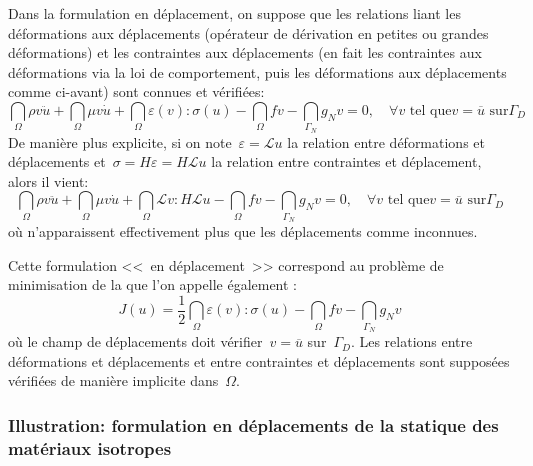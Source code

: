 \medskip
Dans la formulation en déplacement, on suppose que les relations liant les
déformations aux déplacements (opérateur de dérivation en petites ou grandes
déformations) et les contraintes aux déplacements (en fait les contraintes aux
déformations via la loi de comportement, puis les déformations aux déplacements
comme ci-avant) sont connues et vérifiées:
\begin{equation}
\dint_\Omega \rho v\ddot{u} + \dint_\Omega \mu v\dot{u}
+\dint_\Omega \varepsilon(v):\sigma(u) - \dint_\Omega fv
-\dint_{\Gamma_N} g_N v =0, \quad \forall v \text{ tel que} v=\overline{u} \text{ sur} \Gamma_D
\end{equation}
De manière plus explicite, si on note~$\varepsilon=\mathcal{L}u$ la relation entre
déformations et déplacements et~$\sigma = H\varepsilon = H\mathcal{L}u$ la relation entre
contraintes et déplacement, alors il vient:
\begin{equation}
\dint_\Omega \rho v\ddot{u} + \dint_\Omega \mu v\dot{u}
+\dint_\Omega \mathcal{L}v:H\mathcal{L}u - \dint_\Omega fv
-\dint_{\Gamma_N} g_N v =0, \quad \forall v \text{ tel que} v=\overline{u} \text{ sur} \Gamma_D
\end{equation}
où n'apparaissent effectivement plus que les déplacements comme inconnues.


\medskip
Cette formulation <<~en déplacement~>> correspond au problème de minimisation
de la 
que l'on appelle également :
\begin{equation}
J(u)=
\frac12 \dint_\Omega \varepsilon(v):\sigma(u) - \dint_\Omega fv -
\dint_{\Gamma_N} g_N v
\end{equation}
où le champ de déplacements doit vérifier~$v=\overline{u}$ sur~$\Gamma_D$.
Les relations entre déformations et déplacements et entre contraintes et déplacements
sont supposées vérifiées de manière implicite dans~$\Omega$.

\medskip
\subsubsection{Illustration: formulation en déplacements de la statique des matériaux isotropes}

